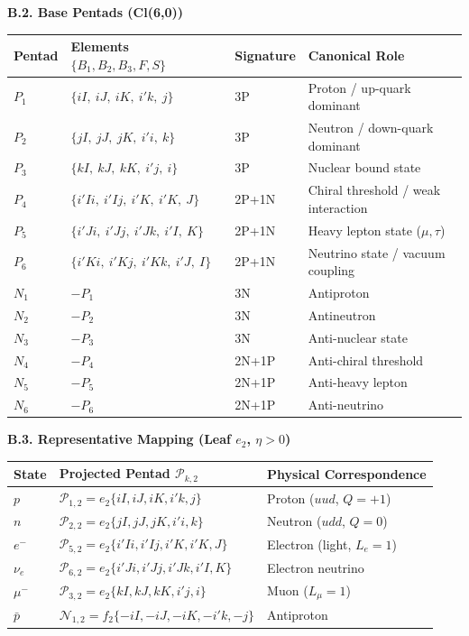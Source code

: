 \documentclass[11pt]{article}
\let\oldmathcal\mathcal
\renewcommand{\mathcal}[1]{\oldmathcal{#1}}
\begin{document}
\textbf{B.2. Base Pentads (Cl(6,0))}

\begin{table}[H]
\centering
\begin{tabular}{@{}llll@{}}
\toprule
Pentad & Elements $\{B_1,B_2,B_3,F,S\}$ & Signature & Canonical Role \\
\midrule
$P_1$ & $\{iI,\ iJ,\ iK,\ i'k,\ j\}$ & 3P & Proton / up-quark dominant \\
$P_2$ & $\{jI,\ jJ,\ jK,\ i'i,\ k\}$ & 3P & Neutron / down-quark dominant \\
$P_3$ & $\{kI,\ kJ,\ kK,\ i'j,\ i\}$ & 3P & Nuclear bound state \\
$P_4$ & $\{i'Ii,\ i'Ij,\ i'K,\ i'K,\ J\}$ & 2P+1N & Chiral threshold / weak interaction \\
$P_5$ & $\{i'Ji,\ i'Jj,\ i'Jk,\ i'I,\ K\}$ & 2P+1N & Heavy lepton state ($\mu,\tau$) \\
$P_6$ & $\{i'Ki,\ i'Kj,\ i'Kk,\ i'J,\ I\}$ & 2P+1N & Neutrino state / vacuum coupling \\
$N_1$ & $-P_1$ & 3N & Antiproton \\
$N_2$ & $-P_2$ & 3N & Antineutron \\
$N_3$ & $-P_3$ & 3N & Anti-nuclear state \\
$N_4$ & $-P_4$ & 2N+1P & Anti-chiral threshold \\
$N_5$ & $-P_5$ & 2N+1P & Anti-heavy lepton \\
$N_6$ & $-P_6$ & 2N+1P & Anti-neutrino \\
\bottomrule
\end{tabular}
\end{table}

\textbf{B.3. Representative Mapping (Leaf \(e_2\), \(\eta>0\))}

\begin{table}[H]
\centering
\begin{tabular}{@{}lll@{}}
\toprule
State & Projected Pentad $\mathcal{P}_{k,2}$ & Physical Correspondence \\
\midrule
$p$ & $\mathcal{P}_{1,2} = e_2\{iI,iJ,iK,i'k,j\}$ & Proton ($uud$, $Q=+1$) \\
$n$ & $\mathcal{P}_{2,2} = e_2\{jI,jJ,jK,i'i,k\}$ & Neutron ($udd$, $Q=0$) \\
$e^-$ & $\mathcal{P}_{5,2} = e_2\{i'Ii,i'Ij,i'K,i'K,J\}$ & Electron (light, $L_e=1$) \\
$\nu_e$ & $\mathcal{P}_{6,2} = e_2\{i'Ji,i'Jj,i'Jk,i'I,K\}$ & Electron neutrino \\
$\mu^-$ & $\mathcal{P}_{3,2} = e_2\{kI,kJ,kK,i'j,i\}$ & Muon ($L_\mu=1$) \\
$\bar{p}$ & $\mathcal{N}_{1,2} = f_2\{-iI,-iJ,-iK,-i'k,-j\}$ & Antiproton \\
\bottomrule
\end{tabular}
\end{table}
\end{document}
